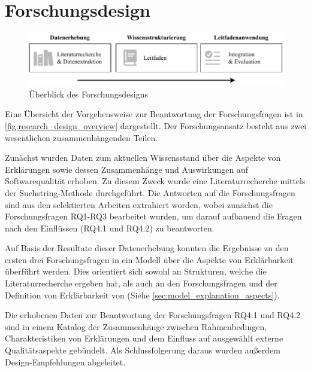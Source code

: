 \section{Forschungsdesign}
\begin{figure}[htb!]
    \begin{center}
        \includegraphics[width=\textwidth]{contents/03_research_design/res/research_design_overview.pdf}
    \end{center}
    \caption{Überblick des Forschungsdesigns}
    \label{fig:research_design_overview}
\end{figure}

Eine Übersicht der Vorgehensweise zur Beantwortung der Forschungsfragen ist in \autoref{fig:research_design_overview} dargestellt. Der Forschungsansatz besteht aus zwei wesentlichen zusammenhängenden Teilen.

Zunächst wurden Daten zum aktuellen Wissensstand über die Aspekte von Erklärungen sowie dessen Zusammenhänge und Auswirkungen auf Softwarequalität erhoben. Zu diesem Zweck wurde eine Literaturrecherche mittels der Suchstring-Methode \cite{kitchenham2004procedures} durchgeführt. Die Antworten auf die Forschungsfragen sind aus den selektierten Arbeiten extrahiert worden, wobei zunächst die Forschungsfragen RQ1-RQ3 bearbeitet wurden, um darauf aufbauend die Fragen nach den Einflüssen (RQ4.1 und RQ4.2) zu beantworten.

Auf Basis der Resultate dieser Datenerhebung konnten die Ergebnisse zu den ersten drei Forschungsfragen in ein Modell über die Aspekte von Erklärbarkeit überführt werden. Dies orientiert sich sowohl an Strukturen, welche die Literaturrecherche ergeben hat, als auch an den Forschungsfragen und der Definition von Erklärbarkeit von \citeauthor{chazette_knowledge_nodate} \cite{chazette_knowledge_nodate} (Siehe \autoref{sec:model_explanation_aspects}).

Die erhobenen Daten zur Beantwortung der Forschungsfragen RQ4.1 und RQ4.2 sind in einem Katalog der Zusammenhänge zwischen Rahmenbedingen, Charakteristiken von Erklärungen und dem Einfluss auf ausgewählt externe  Qualitätsaspekte gebündelt. Als Schlussfolgerung daraus wurden außerdem Design-Empfehlungen abgeleitet.

